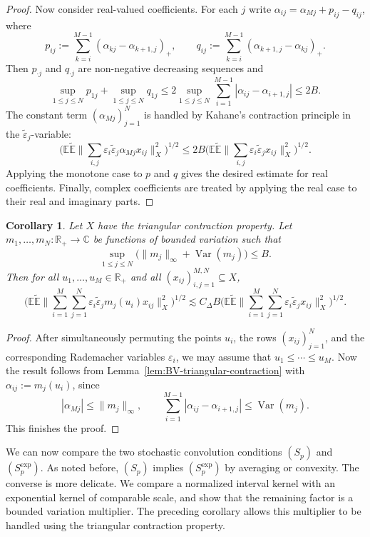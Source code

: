 \documentclass{amsart}
\let\leq\leqslant
\theoremstyle{plain}
\theoremstyle{remark}
\theoremstyle{plain}
\newtheorem{corollary}[theorem]{Corollary}
\numberwithin{equation}{section}
\newcommand{\E}{\mathbb E}
\newcommand{\1}{\mathbf 1}
\newcommand{\wt}{\widetilde}
\begin{document}
\begin{proof}
Now consider real-valued coefficients. For each $j$ write    $\alpha_{ij}=\alpha_{Mj}+p_{ij}-q_{ij}$, where
\[
    p_{ij}:=\sum_{k=i}^{M-1}(\alpha_{kj}-\alpha_{k+1,j})_+,
    \qquad
    q_{ij}:=\sum_{k=i}^{M-1}(\alpha_{k+1,j}-\alpha_{kj})_+.
\]
Then $p_{\cdot j}$ and $q_{\cdot j}$ are non-negative decreasing sequences and
\[
    \sup_{1\leq j\leq N} p_{1j}+\sup_{1\leq j\leq N} q_{1j} \leq 2\sup_{1\leq j\leq N}\sum_{i=1}^{M-1}|\alpha_{ij}-\alpha_{i+1,j}|\leq 2B.
\]
The constant term $(\alpha_{Mj})_{j=1}^N$ is handled by Kahane's contraction principle in
the $\wt{\varepsilon}_j$-variable:
\[
    \Big(\E\wt{\E}\Big\|\sum_{i,j}\varepsilon_i\wt{\varepsilon}_j \alpha_{Mj}x_{ij}\Big\|_X^2\Big)^{1/2}\leq2B\Big(\E\wt{\E}\Big\|\sum_{i,j}\varepsilon_i\wt{\varepsilon}_jx_{ij}\Big\|_X^2\Big)^{1/2}.
\]
Applying the monotone case to $p$ and $q$ gives the desired estimate for real
coefficients. Finally, complex coefficients are treated by applying the real
case to their real and imaginary parts.
\end{proof}


\begin{corollary}\label{cor:BV-functions-triangular}
Let $X$ have the triangular contraction property. Let
$m_1,\ldots,m_N\colon\mathbb R_+\to\mathbb C$ be functions of bounded variation
such that
\[
    \sup_{1\leq j\leq N}
    \bigl(
        \|m_j\|_\infty+\operatorname{Var}(m_j)
    \bigr)
    \leq B .
\]
Then for all $u_1,\ldots,u_M\in\mathbb R_+$ and all
$(x_{ij})_{i,j=1}^{M,N}\subseteq X$,
\[
    \Big(
        \E\wt{\E}
        \Big\|
            \sum_{i=1}^M\sum_{j=1}^N
            \varepsilon_i\wt{\varepsilon}_j m_j(u_i)x_{ij}
        \Big\|_X^2
    \Big)^{1/2}
    \lesssim
    C_\Delta B
    \Big(
        \E\wt{\E}
        \Big\|
            \sum_{i=1}^M\sum_{j=1}^N
            \varepsilon_i\wt{\varepsilon}_jx_{ij}
        \Big\|_X^2
    \Big)^{1/2}.
\]
\end{corollary}

\begin{proof}
After simultaneously permuting the points $u_i$, the rows
$(x_{ij})_{j=1}^N$, and the corresponding Rademacher variables
$\varepsilon_i$, we may assume that
$u_1\leq\cdots\leq u_M$. Now the result follows from 
Lemma~\ref{lem:BV-triangular-contraction} with $\alpha_{ij}:=m_j(u_i)$, since
\[
    |\alpha_{Mj}|\leq\|m_j\|_\infty,    \qquad    \sum_{i=1}^{M-1}|\alpha_{ij}-\alpha_{i+1,j}|\leq \operatorname{Var}(m_j).
\]
This finishes the proof.
\end{proof}

We can now compare the two stochastic convolution conditions  $(S_p)$ and $(S_p^{\exp})$. As noted before, $(S_p)$ implies $(S_p^{\exp})$ by averaging or convexity. The converse is more delicate. We compare a normalized interval kernel with an exponential kernel of comparable scale, and show that the remaining factor is a bounded variation multiplier. The preceding corollary allows this multiplier to be handled using the triangular contraction property.
\end{document}
